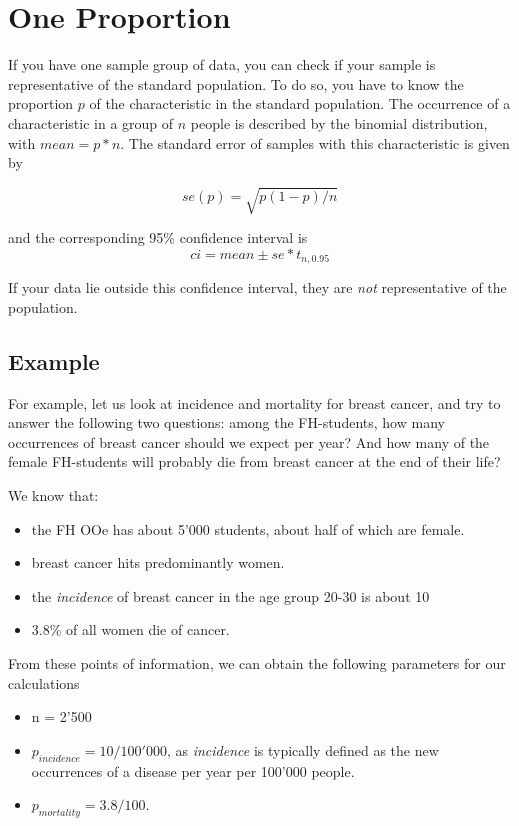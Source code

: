 \section{One Proportion}

If you have one sample group of data, you can check if your sample is representative of the standard population. To do so, you have to know the proportion $p$ of the characteristic in the standard population. The occurrence of a characteristic in a group of $n$ people is described by the binomial distribution, with $mean = p*n$. The standard error of samples with this characteristic is given by

\begin{equation}
  se(p) = \sqrt{p(1-p)/n}
\end{equation}

and the corresponding 95\% confidence interval is
\begin{equation*}
  ci = mean \pm se * t_{n,0.95}
\end{equation*}

If your data lie outside this confidence interval, they are \emph{not} representative of the population.

\subsection{Example}

For example, let us look at incidence and mortality for breast cancer, and try to answer the following two questions: among the FH-students, how many occurrences of breast cancer should we expect per year? And how many of the female FH-students will probably die from breast cancer at the end of their life?

We know that:

\begin{itemize}
  \item the FH OOe has about 5'000 students, about half of which are female.
  \item breast cancer hits predominantly women.
  \item the \emph{incidence} of breast cancer in the age group 20-30 is about 10
  \item 3.8\% of all women die of cancer.
\end{itemize}

From these points of information, we can obtain the following parameters for our calculations

\begin{itemize}
  \item n = 2'500
  \item $p_{incidence} = 10 / 100'000$, as \emph{incidence} is typically defined as the new occurrences of a disease per year per 100'000 people.
  \item $p_{mortality} = 3.8/100$.
\end{itemize}

